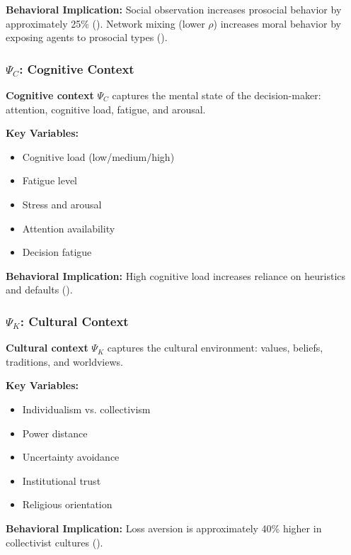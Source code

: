 \textbf{Behavioral Implication:}
Social observation increases prosocial behavior by approximately 25\%
(\citet{ariely2009doing}). Network mixing (lower $\rho$) increases moral behavior
by exposing agents to prosocial types (\citet{benabou2018narratives}).

\subsubsection{$\Psi_C$: Cognitive Context}

\begin{definition}
\textbf{Cognitive context} $\Psi_C$ captures the mental state of the decision-maker:
attention, cognitive load, fatigue, and arousal.
\end{definition}

\textbf{Key Variables:}
\begin{itemize}[nosep]
\item Cognitive load (low/medium/high)
\item Fatigue level
\item Stress and arousal
\item Attention availability
\item Decision fatigue
\end{itemize}

\textbf{Behavioral Implication:}
High cognitive load increases reliance on heuristics and defaults
(\citet{kahneman2011thinking}).

\subsubsection{$\Psi_K$: Cultural Context}

\begin{definition}
\textbf{Cultural context} $\Psi_K$ captures the cultural environment:
values, beliefs, traditions, and worldviews.
\end{definition}

\textbf{Key Variables:}
\begin{itemize}[nosep]
\item Individualism vs. collectivism
\item Power distance
\item Uncertainty avoidance
\item Institutional trust
\item Religious orientation
\end{itemize}

\textbf{Behavioral Implication:}
Loss aversion is approximately 40\% higher in collectivist cultures
(\citet{wang2017cultural}).

